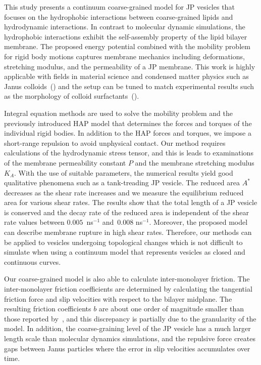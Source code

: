 \documentclass[lineno]{jfm}
\begin{document}
This study presents a continuum coarse-grained model for JP vesicles
that focuses on the hydrophobic interactions between coarse-grained
lipids and hydrodynamic interactions. In contrast to molecular dynamic
simulations, the hydrophobic interactions exhibit the self-assembly
property of the lipid bilayer membrane. The proposed energy potential
combined with the mobility problem for rigid body motions captures
membrane mechanics including deformations, stretching modulus, and the
permeability of a JP membrane. This work is highly applicable with
fields in material science and condensed matter physics such as Janus
colloids~(\cite{Bradley2017,Mallory2017}) and the setup can be tuned to
match experimental results such as the morphology of colloid
surfactants~(\cite{Bradley2016}).

Integral equation methods are used to solve the mobility problem and the
previously introduced HAP model that determines the forces and torques
of the individual rigid bodies. In addition to the HAP forces and
torques, we impose a short-range repulsion to avoid unphysical contact.
Our method requires calculations of the hydrodynamic stress tensor, and
this is leads to examinations of the membrane permeability constant $P$
and the membrane stretching modulus $K_A$. With the use of suitable
parameters, the numerical results yield good qualitative phenomena such
as a tank-treading JP vesicle. The reduced area $A^*$ decreases as the
shear rate increases and we measure the equilibrium reduced area for
various shear rates. The results show that the total length of a JP
vesicle is conserved and the decay rate of the reduced area is
independent of the shear rate values  between $0.005$~ns$^{-1}$
and~$0.008$ ns$^{-1}$. Moreover, the proposed model can describe
membrane rupture in high shear rates. Therefore, our methods can be
applied to vesicles undergoing topological changes which is not
difficult to simulate when using a continuum model that represents
vesicles as closed and continuous curves.

Our coarse-grained model is also able to calculate inter-monolayer
friction. The inter-monolayer friction coefficients are determined by
calculating the tangential friction force and slip velocities with
respect to the bilayer midplane. The resulting friction coefficients $b$
are about one order of magnitude smaller than those reported
by~\cite{denOtter2007}, and this discrepancy is partially due to the
granularity of the model. In addition, the coarse-graining level of the
JP vesicle has a much larger length scale than molecular dynamics
simulations, and the repulsive force creates gaps between Janus
particles where the error in slip velocities accumulates over time.
\end{document}

